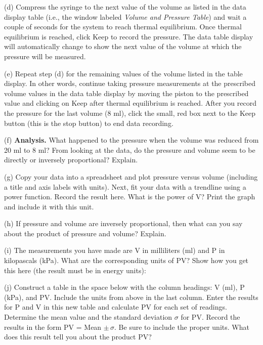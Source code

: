 (d) Compress the syringe to the next value of the volume as listed in the data
display table (i.e., the window labeled \textit{Volume and Pressure Table})
and wait a couple of seconds for the system to reach thermal equilibrium. Once 
thermal equilibrium is reached, click Keep to record the pressure. The data 
table display will automatically change to show the next value of the volume 
at which the pressure will be measured. 

(e) Repeat step (d) for the remaining values of the volume listed in the table
display. In other words, continue taking pressure measurements at the prescribed
volume values in the data table display by moving the piston to the prescribed
value and clicking on Keep after thermal equilibrium is reached. After you record
the pressure for the last volume (8 ml), click the small, red box next to the
Keep button (this is the stop button) to end data recording.

(f) \textbf{Analysis.} What happened to the pressure when the volume was 
reduced from 20 ml to 8 ml? From looking at the data, do the pressure and 
volume seem to be directly or inversely proportional? Explain.
\vspace{25mm}

(g) Copy your data into a spreadsheet and plot pressure versus volume 
(including a title and axis labels with units). Next, fit your data with a 
trendline using a power function. Record the result here. What is the power of 
V? Print the graph and include it with this unit.
\vspace{25mm}

(h) If pressure and volume are inversely proportional, then what can you say
about the product of pressure and volume? Explain.
\vspace{25mm}

\newpage

(i) The measurements you have made are V in milliliters (ml) and P in 
kilopascals (kPa). What are the corresponding units of PV? Show how you get 
this here (the result must be in energy units):
\vspace{40mm}

(j) Construct a table in the space below with the column headings: V (ml), P
(kPa), and PV. Include the units from above in the last column.
Enter the results for P and V in this new table and calculate
PV for each set of readings. Determine the mean value and the standard deviation
\( \sigma  \) for PV. Record the results in the form 
PV = Mean \( \pm \, \sigma  \). Be sure to include the proper units. 
What does this result tell you about the  product PV?


